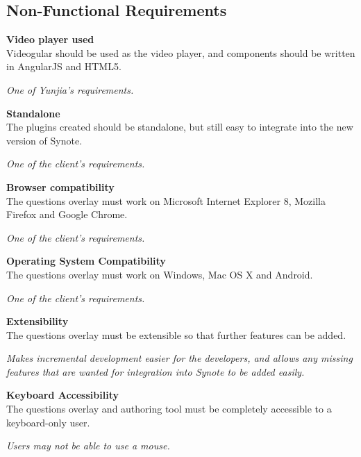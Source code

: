 \subsection{Non-Functional Requirements}
\begin{requirement}[label=\textbf{N\arabic*}]
	\item \textbf{Video player used} \label{Req:Video player used} \hfill \\ 
		\gls{Videogular} should be used as the video player, and components should be written in \gls{AngularJS} and \gls{HTML5}.

		\textit{One of Yunjia's requirements.}

	\item \textbf{Standalone} \label{Req:Standalone} \hfill \\ 
		The plugins created should be standalone, but still easy to integrate into the new version of Synote.

		\textit{One of the client's requirements.}

	\item \textbf{Browser compatibility} \label{Req:Browser compatibility} \hfill \\ 
		The questions overlay must work on Microsoft Internet Explorer 8, Mozilla Firefox and Google Chrome.

		\textit{One of the client's requirements.}

	\item \textbf{Operating System Compatibility} \label{Req:OS compatibility} \hfill \\ 
		The questions overlay must work on Windows, Mac OS X and Android.

		\textit{One of the client's requirements.}

	\item \textbf{Extensibility} \label{Req:Extensibility} \hfill \\ 
		The questions overlay must be extensible so that further features can be added. 

		\textit{Makes incremental development easier for the developers, and allows any missing features that are wanted for integration into Synote to be added easily.}

	\item \textbf{Keyboard Accessibility}\label{Req:Keyboard accessibility} \hfill \\ 
		The questions overlay and authoring tool must be completely accessible to a keyboard-only user.

		\textit{Users may not be able to use a mouse.}


\end{requirement}
